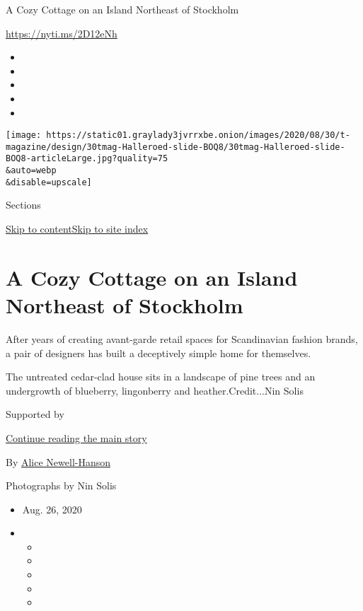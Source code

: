 A Cozy Cottage on an Island Northeast of Stockholm

\url{https://nyti.ms/2D12eNh}

\begin{itemize}
\item
\item
\item
\item
\item
\end{itemize}

\texttt{[image: https://static01.graylady3jvrrxbe.onion/images/2020/08/30/t-magazine/design/30tmag-Halleroed-slide-BOQ8/30tmag-Halleroed-slide-BOQ8-articleLarge.jpg?quality=75\\\&auto=webp\\\&disable=upscale]}

Sections

\protect\hyperlink{site-content}{Skip to
content}\protect\hyperlink{site-index}{Skip to site index}

\hypertarget{a-cozy-cottage-on-an-island-northeast-of-stockholm}{%
\section{A Cozy Cottage on an Island Northeast of
Stockholm}\label{a-cozy-cottage-on-an-island-northeast-of-stockholm}}

After years of creating avant-garde retail spaces for Scandinavian
fashion brands, a pair of designers has built a deceptively simple home
for themselves.

The untreated cedar-clad house sits in a landscape of pine trees and an
undergrowth of blueberry, lingonberry and heather.Credit...Nin Solis

Supported by

\protect\hyperlink{after-sponsor}{Continue reading the main story}

By
\href{https://www.nytimes3xbfgragh.onion/by/alice-newell-hanson}{Alice
Newell-Hanson}

Photographs by Nin Solis

\begin{itemize}
\item
  Aug. 26, 2020
\item
  \begin{itemize}
  \item
  \item
  \item
  \item
  \item
  \end{itemize}
\end{itemize}


